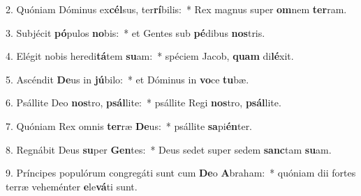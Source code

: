 2. Quóniam Dóminus ex\textbf{cél}sus, ter\textbf{rí}bilis:~*  Rex magnus super \textbf{om}nem \textbf{ter}ram.\

3. Subjécit \textbf{pó}pulos \textbf{no}bis:~*  et Gentes sub \textbf{pé}dibus \textbf{nos}tris.\

4. Elégit nobis heredi\textbf{tá}tem \textbf{su}am:~*  spéciem Jacob, \textbf{quam} di\textbf{lé}xit.\

5. Ascéndit \textbf{De}us in \textbf{jú}bilo:~*  et Dóminus in \textbf{vo}ce \textbf{tu}bæ.\

6. Psállite Deo \textbf{nos}tro, \textbf{psál}lite:~*  psállite Regi \textbf{nos}tro, \textbf{psál}lite.\

7. Quóniam Rex omnis \textbf{ter}ræ \textbf{De}us:~*  psállite \textbf{sa}pi\textbf{én}ter.\

8. Regnábit Deus \textbf{su}per \textbf{Gen}tes:~*  Deus sedet super sedem \textbf{sanc}tam \textbf{su}am.\

9. Príncipes populórum congregáti sunt cum \textbf{De}o \textbf{A}braham:~*  quóniam dii fortes terræ veheménter \textbf{e}le\textbf{vá}ti sunt.\

